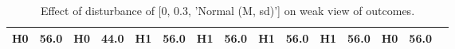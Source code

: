 \begin{table}
\begin{tabular}{l|cc|cc|cc|cc|cc|cc|cc}
\cellcolor{Bittersweet}H0&\cellcolor{Bittersweet}56.0&\cellcolor{Bittersweet}H0&\cellcolor{Bittersweet}44.0&\cellcolor{Bittersweet}H1&\cellcolor{Bittersweet}56.0&\cellcolor{Bittersweet}H1&\cellcolor{Bittersweet}56.0&\cellcolor{Bittersweet}H1&\cellcolor{Bittersweet}56.0&\cellcolor{Bittersweet}H1&\cellcolor{Bittersweet}56.0&\cellcolor{Bittersweet}H0&\cellcolor{Bittersweet}56.0\\\bottomrule\end{tabular}\caption{Effect of disturbance of [0, 0.3, 'Normal (M, sd)'] on weak view of outcomes.}\end{table}